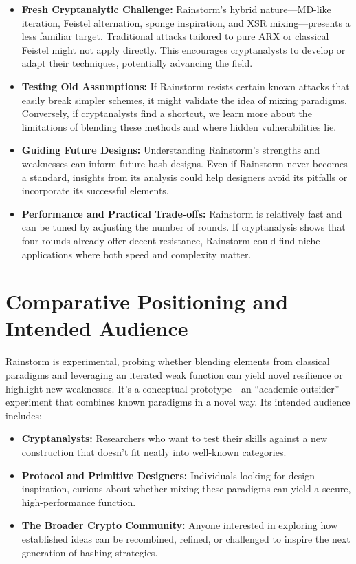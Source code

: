 \documentclass[11pt,a4paper]{article}
\begin{document}
\begin{itemize}
  \item \textbf{Fresh Cryptanalytic Challenge:} Rainstorm’s hybrid nature—MD-like iteration, Feistel alternation, sponge inspiration, and XSR mixing—presents a less familiar target. Traditional attacks tailored to pure ARX or classical Feistel might not apply directly. This encourages cryptanalysts to develop or adapt their techniques, potentially advancing the field.

  \item \textbf{Testing Old Assumptions:} If Rainstorm resists certain known attacks that easily break simpler schemes, it might validate the idea of mixing paradigms. Conversely, if cryptanalysts find a shortcut, we learn more about the limitations of blending these methods and where hidden vulnerabilities lie.

  \item \textbf{Guiding Future Designs:} Understanding Rainstorm’s strengths and weaknesses can inform future hash designs. Even if Rainstorm never becomes a standard, insights from its analysis could help designers avoid its pitfalls or incorporate its successful elements.

  \item \textbf{Performance and Practical Trade-offs:} Rainstorm is relatively fast and can be tuned by adjusting the number of rounds. If cryptanalysis shows that four rounds already offer decent resistance, Rainstorm could find niche applications where both speed and complexity matter.
\end{itemize}

\section*{Comparative Positioning and Intended Audience}
Rainstorm is experimental, probing whether blending elements from classical paradigms and leveraging an iterated weak function can yield novel resilience or highlight new weaknesses. It’s a conceptual prototype—an “academic outsider” experiment that combines known paradigms in a novel way. Its intended audience includes:

\begin{itemize}
  \item \textbf{Cryptanalysts:} Researchers who want to test their skills against a new construction that doesn’t fit neatly into well-known categories.
  
  \item \textbf{Protocol and Primitive Designers:} Individuals looking for design inspiration, curious about whether mixing these paradigms can yield a secure, high-performance function.
  
  \item \textbf{The Broader Crypto Community:} Anyone interested in exploring how established ideas can be recombined, refined, or challenged to inspire the next generation of hashing strategies.
\end{itemize}
\end{document}
